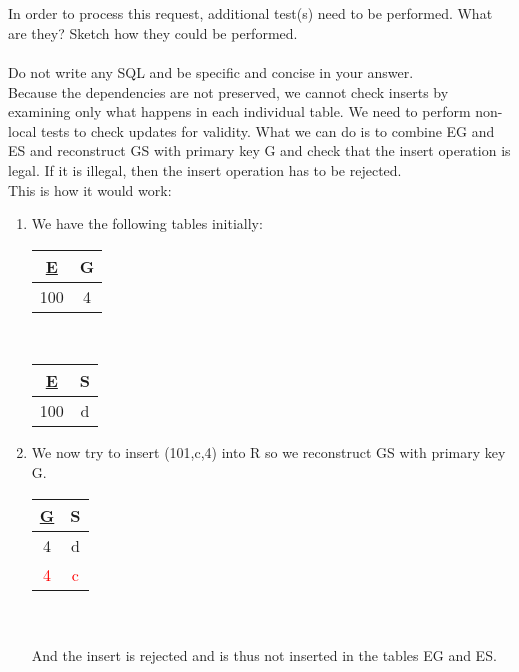 \documentclass[11pt]{article}
\begin{document}
\begin{enumerate}
{{\\\\ In order to process this request, additional test(s) need to be performed. What are they? Sketch how they could be performed.
\\\\ Do not write any SQL and be specific and concise in your answer.}}
    \\ Because the dependencies are not preserved, we cannot check inserts by examining only what happens in each individual table.
    We need to perform non-local tests to check updates for validity. What we can do is to combine EG and ES and reconstruct GS with primary key G and check that the insert operation is legal. If it is illegal, then the insert operation has to be rejected.
    \\ This is how it would work:
    \begin{enumerate}
        \item We have the following tables initially:
        \\
        \begin{tabular}{|c|c|} 
            \hline
            \underline{E} & G \\
            \hline
            100 & 4 \\ 
            \hline
        \end{tabular}
        \ \ \ \ \ \ \ \ \ \ \ \ \ \ \ \ 
        \begin{tabular}{|c|c|} 
            \hline
            \underline{E} & S \\
            \hline
            100 & d \\ 
            \hline
        \end{tabular}
        \item We now try to insert (101,c,4) into R so we reconstruct GS with primary key G.
        \\
        \begin{tabular}{|c|c|} 
            \hline
            \underline{G} & S \\
            \hline
            4 & d \\ 
            \textcolor{red}{4} & \textcolor{red}{c} \\
            \hline
        \end{tabular}
        \\\\ And the insert is rejected and is thus not inserted in the tables EG and ES.     
    \end{enumerate}

\end{enumerate}
\end{document}
